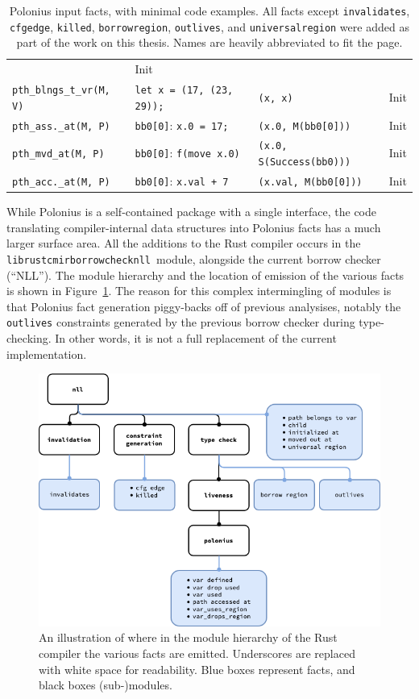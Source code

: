 \documentclass[11pt,a4paper,twoside,openany]{report}
\newcommand{\InRust}[1]{\texttt{#1}}
\newcommand{\InDatalog}[1]{\texttt{#1}}
\def\ModSep{\discretionary{::}{}{::}}
\renewcommand\_{\textunderscore\allowbreak}
\begin{document}
{\begin{table}[!htbp]
\begin{tabular}{@{}l l@{} l@{} @{}l@{}}
       & Init  \\
  \InDatalog{pth_blngs_t_vr(M, V)} & \InRust{let x = (17, (23, 29));} & \InRust{(x, x)} & Init  \\
  \InDatalog{pth_ass._at(M, P)} & \InRust{bb0[0]}: \InRust{x.0 = 17;} & \InRust{(x.0, M(bb0[0]))} & Init  \\
  \InDatalog{pth_mvd_at(M, P)} & \InRust{bb0[0]}: \InRust{f(move x.0)} & \InRust{(x.0, S(Success(bb0)))} & Init  \\
  \InDatalog{pth_acc._at(M, P)} & \InRust{bb0[0]}: \InRust{x.val + 7} & \InRust{(x.val, M(bb0[0]))} & Init
\end{tabular}
\caption[Input Facts to Polonius]{Polonius input facts, with minimal code
  examples. All facts except \texttt{invalidates}, \texttt{cfg\_edge},
  \texttt{killed}, \texttt{borrow\_region}, \texttt{outlives}, and
  \texttt{universal\_region} were added as part of the work on this thesis.
  Names are heavily abbreviated to fit the page.}\label{tab:input-facts}
\end{table}%
}

While Polonius is a self-contained package with a single interface, the code
translating compiler-internal data structures into Polonius facts has a much
larger surface area. All the additions to the Rust compiler occurs in the
\texttt{librustc\_mir\ModSep{}borrow\_check\ModSep{}nll}~module, alongside the current borrow
checker (``NLL''). The module hierarchy and the location of emission of the
various facts is shown in Figure~\ref{fig:fact-module-hierarchy}. The reason for
this complex intermingling of modules is that Polonius fact generation
piggy-backs off of previous analysises, notably the \texttt{outlives}
constraints generated by the previous borrow checker during type-checking. In
other words, it is not a full replacement of the current implementation.

\begin{figure}[h!]
  \centering
  \includegraphics[width=0.9\linewidth]{Graphs/rustc-module-structure}
  \caption[Polonius In Rust's Module Hierarchy]{An illustration of where in the
    module hierarchy of the Rust compiler the various facts are emitted.
    Underscores are replaced with white space for readability. Blue boxes
    represent facts, and black boxes (sub-)modules.}\label{fig:fact-module-hierarchy}
\end{figure}
\end{document}
